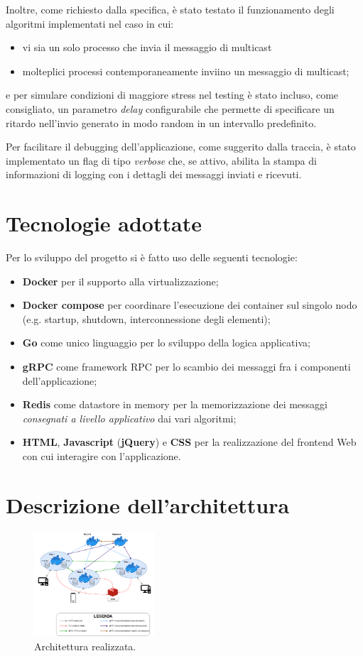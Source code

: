 \documentclass[conference]{IEEEtran}
\begin{document}
Inoltre, come richiesto dalla specifica, è stato testato il funzionamento degli algoritmi implementati nel caso in cui:
\begin{itemize}
\item vi sia un solo processo che invia il messaggio di multicast
\item molteplici processi contemporaneamente inviino un
messaggio di multicast;
\end{itemize}
e per simulare condizioni di maggiore stress nel testing è stato incluso, come consigliato, un parametro \textit{delay} configurabile che permette di specificare un ritardo nell'invio generato in modo random in un intervallo predefinito.

Per facilitare il debugging dell'applicazione, come suggerito dalla traccia, è stato implementato un flag di tipo \textit{verbose} che, se attivo, abilita la stampa di informazioni di logging con i dettagli dei messaggi inviati e ricevuti.

\section{Tecnologie adottate}
Per lo sviluppo del progetto si è fatto uso delle seguenti tecnologie:
\begin{itemize}
\item \textbf{Docker} per il supporto alla virtualizzazione;
\item \textbf{Docker compose} per coordinare l'esecuzione dei container sul singolo nodo (e.g. startup, shutdown, interconnessione degli elementi);
\item \textbf{Go} come unico linguaggio per lo sviluppo della logica applicativa;
\item \textbf{gRPC} come framework RPC per lo scambio dei messaggi fra i componenti dell'applicazione;
\item \textbf{Redis} come datastore in memory per la memorizzazione dei messaggi \textit{consegnati a livello applicativo} dai vari algoritmi;
\item \textbf{HTML}, \textbf{Javascript} (\textbf{jQuery}) e \textbf{CSS} per la realizzazione del frontend Web con cui interagire con l'applicazione.
\end{itemize}

\section{Descrizione dell'architettura}
\begin{figure}[htbp]
\centerline{\includegraphics[width=0.4\textwidth]{figs/architecture.png}}
\caption{Architettura realizzata.}
\label{fig:architecture}
\end{figure}
\end{document}
